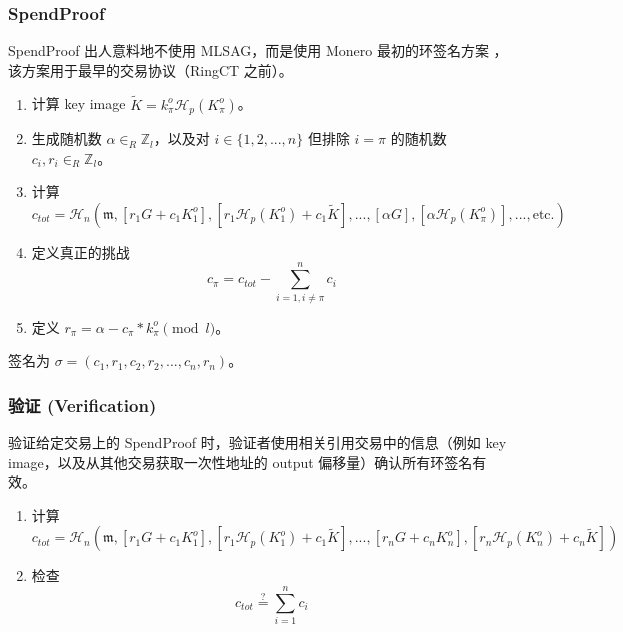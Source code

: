 \subsubsection*{SpendProof}

SpendProof 出人意料地不使用 MLSAG，而是使用 Monero 最初的环签名方案 ，该方案用于最早的交易协议（RingCT 之前）\cite{cryptoNoteWhitePaper}。

\begin{enumerate}
	\item 计算 key image \(\tilde{K} = k^o_\pi \mathcal{H}_p(K^o_\pi)\)。

	\item 生成随机数 \(\alpha \in_R \mathbb{Z}_l\)，以及对 \(i \in \{1, 2, ..., n\}\) 但排除 \(i = \pi\) 的随机数 \(c_i, r_i \in_R \mathbb{Z}_l\)。

	\item 计算
	\[c_{tot} = \mathcal{H}_n(\mathfrak{m},[r_1 G + c_1 K^o_1],[r_1 \mathcal{H}_p(K^o_1) + c_1 \tilde{K}],...,[\alpha G],[\alpha \mathcal{H}_p(K^o_{\pi})],...,\textrm{etc.})\]

	\item 定义真正的挑战
	\[c_{\pi} = c_{tot} - \sum^{n}_{i=1,i\neq \pi} c_i\]

	\item 定义 \(r_{\pi} = \alpha - c_{\pi}*k^o_{\pi} \pmod l\)。
\end{enumerate}

签名为 $\sigma = (c_1, r_1,c_2,r_2,...,c_n,r_n)$。

\subsubsection*{验证 (Verification)}

验证给定交易上的 SpendProof 时，验证者使用相关引用交易中的信息（例如 key image，以及从其他交易获取一次性地址的 output 偏移量）确认所有环签名有效。

\begin{enumerate}
	\item 计算
	\[c_{tot} = \mathcal{H}_n(\mathfrak{m},[r_1 G + c_1 K^o_1],[r_1 \mathcal{H}_p(K^o_1) + c_1 \tilde{K}],...,[r_n G + c_n K^o_n],[r_n \mathcal{H}_p(K^o_n) + c_n \tilde{K}])\]

	\item 检查
	\[c_{tot} \stackrel{?}{=} \sum^{n}_{i=1} c_i\]
\end{enumerate}

